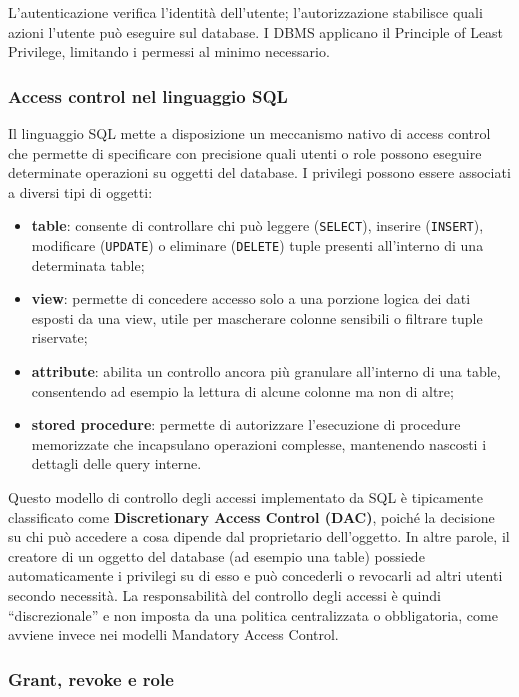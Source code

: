 L'autenticazione verifica l’identità dell’utente; l’autorizzazione stabilisce quali azioni l’utente può eseguire sul database.
I DBMS applicano il Principle of Least Privilege, limitando i permessi al minimo necessario.

\subsubsection{Access control nel linguaggio SQL}

Il linguaggio SQL mette a disposizione un meccanismo nativo di access control che permette di specificare con precisione quali utenti o role possono eseguire determinate operazioni su oggetti del database.
I privilegi possono essere associati a diversi tipi di oggetti:
\begin{itemize}
    \item \textbf{table}: consente di controllare chi può leggere (\texttt{SELECT}), inserire (\texttt{INSERT}), modificare (\texttt{UPDATE}) o eliminare (\texttt{DELETE}) tuple presenti all'interno di una determinata table;
    \item \textbf{view}: permette di concedere accesso solo a una porzione logica dei dati esposti da una view, utile per mascherare colonne sensibili o filtrare tuple riservate;
    \item \textbf{attribute}: abilita un controllo ancora più granulare all'interno di una table, consentendo ad esempio la lettura di alcune colonne ma non di altre;
    \item \textbf{stored procedure}: permette di autorizzare l'esecuzione di procedure memorizzate che incapsulano operazioni complesse, mantenendo nascosti i dettagli delle query interne.
\end{itemize}

Questo modello di controllo degli accessi implementato da SQL è tipicamente classificato come \textbf{Discretionary Access Control (DAC)}, poiché la decisione su chi può accedere a cosa dipende dal proprietario dell’oggetto.
In altre parole, il creatore di un oggetto del database (ad esempio una table) possiede automaticamente i privilegi su di esso e può concederli o revocarli ad altri utenti secondo necessità.
La responsabilità del controllo degli accessi è quindi ``discrezionale'' e non imposta da una politica centralizzata o obbligatoria, come avviene invece nei modelli Mandatory Access Control.

\subsubsection{Grant, revoke e role}

